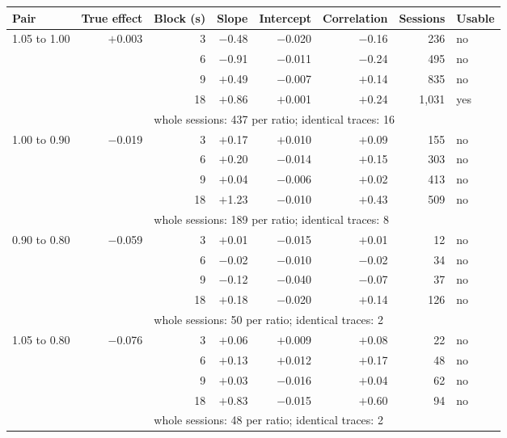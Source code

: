 \begin{tabular}{lrrrrrrl}
\toprule
Pair & True effect & Block (s) & Slope & Intercept & Correlation & Sessions & Usable \\
\midrule
1.05 to 1.00 & $+$0.003 & 3 & $-$0.48 & $-$0.020 & $-$0.16 & 236 & no \\
 &  & 6 & $-$0.91 & $-$0.011 & $-$0.24 & 495 & no \\
 &  & 9 & $+$0.49 & $-$0.007 & $+$0.14 & 835 & no \\
 &  & 18 & $+$0.86 & $+$0.001 & $+$0.24 & 1{,}031 & yes \\
 & & \multicolumn{6}{l}{whole sessions: 437 per ratio; identical traces: 16} \\
1.00 to 0.90 & $-$0.019 & 3 & $+$0.17 & $+$0.010 & $+$0.09 & 155 & no \\
 &  & 6 & $+$0.20 & $-$0.014 & $+$0.15 & 303 & no \\
 &  & 9 & $+$0.04 & $-$0.006 & $+$0.02 & 413 & no \\
 &  & 18 & $+$1.23 & $-$0.010 & $+$0.43 & 509 & no \\
 & & \multicolumn{6}{l}{whole sessions: 189 per ratio; identical traces: 8} \\
0.90 to 0.80 & $-$0.059 & 3 & $+$0.01 & $-$0.015 & $+$0.01 & 12 & no \\
 &  & 6 & $-$0.02 & $-$0.010 & $-$0.02 & 34 & no \\
 &  & 9 & $-$0.12 & $-$0.040 & $-$0.07 & 37 & no \\
 &  & 18 & $+$0.18 & $-$0.020 & $+$0.14 & 126 & no \\
 & & \multicolumn{6}{l}{whole sessions: 50 per ratio; identical traces: 2} \\
1.05 to 0.80 & $-$0.076 & 3 & $+$0.06 & $+$0.009 & $+$0.08 & 22 & no \\
 &  & 6 & $+$0.13 & $+$0.012 & $+$0.17 & 48 & no \\
 &  & 9 & $+$0.03 & $-$0.016 & $+$0.04 & 62 & no \\
 &  & 18 & $+$0.83 & $-$0.015 & $+$0.60 & 94 & no \\
 & & \multicolumn{6}{l}{whole sessions: 48 per ratio; identical traces: 2} \\
\bottomrule
\end{tabular}
